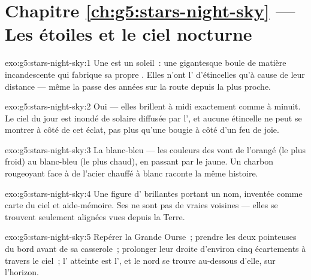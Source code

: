 \section*{Chapitre \ref{ch:g5:stars-night-sky} --- Les étoiles et le ciel nocturne}

\begin{solution}{exo:g5:stars-night-sky:1}
Une  est un soleil~: une gigantesque boule de matière
incandescente qui fabrique sa propre . Elles n'ont l'
d'étincelles qu'à cause de leur distance --- même la  passe
des années sur la route depuis la plus proche.
\end{solution}

\begin{solution}{exo:g5:stars-night-sky:2}
Oui --- elles brillent à midi exactement comme à minuit. Le ciel du
jour est inondé de  solaire diffusée par l', et aucune
étincelle ne peut se montrer à côté de cet éclat, pas plus qu'une
bougie à côté d'un feu de joie.
\end{solution}

\begin{solution}{exo:g5:stars-night-sky:3}
La blanc-bleu --- les couleurs des  vont de l'orangé (le plus
froid) au blanc-bleu (le plus chaud), en passant par le jaune. Un
charbon rougeoyant face à de l'acier chauffé à blanc raconte la même
histoire.
\end{solution}

\begin{solution}{exo:g5:stars-night-sky:4}
Une figure d' brillantes portant un nom, inventée comme carte
du ciel et aide-mémoire. Ses  ne sont pas de vraies voisines
--- elles se trouvent seulement alignées vues depuis la Terre.
\end{solution}

\begin{solution}{exo:g5:stars-night-sky:5}
Repérer la Grande Ourse~; prendre les deux  pointeuses du bord
avant de sa casserole~; prolonger leur droite d'environ cinq
écartements à travers le ciel~; l' atteinte est l', et le nord se trouve au-dessous d'elle, sur l'horizon.
\end{solution}

